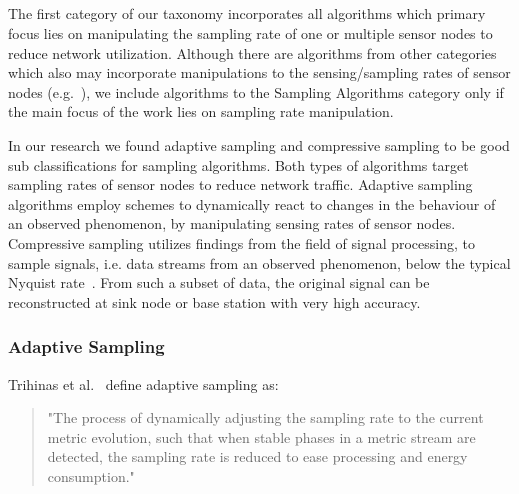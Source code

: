 \FloatBarrier


\subsection{\catI} %
\label{sec:catI}

The first category of our taxonomy incorporates all algorithms which primary
focus lies on manipulating the sampling rate of one or multiple sensor nodes to
reduce network utilization. Although there are algorithms from other categories
which also may incorporate manipulations to the sensing/sampling rates of
sensor nodes (e.g.~\cite{trihinas2015adam}), we include algorithms to the
Sampling Algorithms category only if the main focus of the work lies on
sampling rate manipulation. 


In our research we found adaptive sampling and compressive sampling to be good
sub classifications for sampling algorithms. Both types of algorithms target
sampling rates of sensor nodes to reduce network traffic. Adaptive sampling
algorithms employ schemes to dynamically react to changes in the behaviour of
an observed phenomenon, by manipulating sensing rates of sensor nodes.
Compressive sampling utilizes findings from the field of signal processing, to
sample signals, i.e. data streams from an observed phenomenon, below the
typical Nyquist rate~\cite{candes2008introduction}. From such a subset of data,
the original signal can be reconstructed at sink node or base station with very
high accuracy.

\subsubsection{Adaptive Sampling}
\label{sec:Adaptive Sampling}

Trihinas et al.~\cite{trihinas2015adam} define adaptive sampling as:

\begin{quote}
    "The process of dynamically adjusting the sampling rate to the current
    metric evolution, such that when stable phases in a metric stream are
    detected, the sampling rate is reduced to ease processing and energy
    consumption."
\end{quote}

